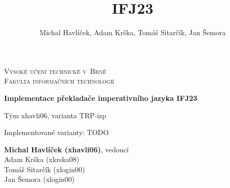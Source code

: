 \documentclass[12pt,a4paper]{article}
\author{Michal Havlíček, Adam Krška, Tomáš Sitarčík, Jan Šemora}
\title{IFJ23}
\begin{document}
\makeatletter
\begin{titlepage}
\begin{center}
	{\Huge\textsc{Vysoké učení technické v~Brně}\\[0.4em]
	\LARGE\textsc{Fakulta informačních technologií}}


	{\bfseries\LARGE Implementace překladače imperativního jazyka IFJ23}

	\vspace{1cm}

	{\LARGE Tým xhavli06, varianta TRP-izp}
	\vspace{1cm}

	{\large Implementované varianty: TODO}

	{
		\large
		\textbf{Michal Havlíček (xhavli06)}, vedoucí\\
		Adam Krška (xkrska08)\\
		Tomáš Sitarčík (xlogin00)\\
		Jan Šemora (xlogin00)
	}
\end{center}
\end{titlepage}
\makeatother

\tableofcontents
\end{document}

